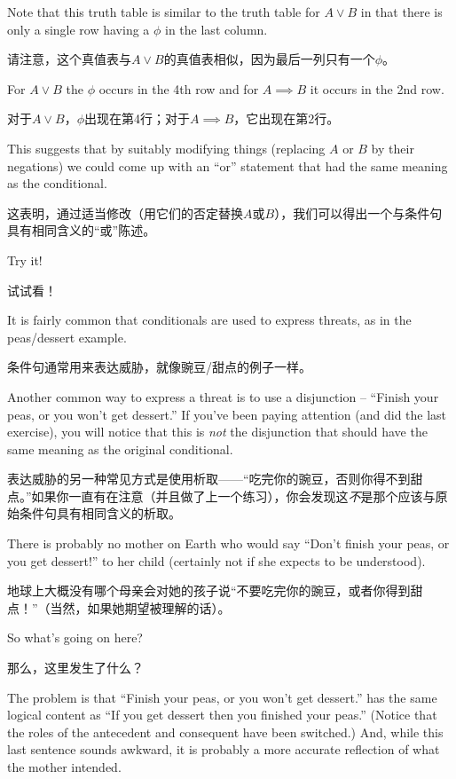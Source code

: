 \begin{exer} 
Note that this truth table is similar to the truth table for
$A \lor B$ in that there is only a single row having a $\phi$ in
the last column.

请注意，这个真值表与$A \lor B$的真值表相似，因为最后一列只有一个$\phi$。

For $A \lor B$ the $\phi$ occurs in the 4th row
and for $A \implies B$ it occurs in the 2nd row.

对于$A \lor B$，$\phi$出现在第4行；对于$A \implies B$，它出现在第2行。

This suggests
that by suitably modifying things (replacing $A$ or $B$ by their
negations) we could come up with an ``or'' statement that had the 
same meaning as the conditional.

这表明，通过适当修改（用它们的否定替换$A$或$B$），我们可以得出一个与条件句具有相同含义的“或”陈述。

Try it!

试试看！
\end{exer}

It is fairly common that conditionals are used to express threats,
as in the peas/dessert example.

条件句通常用来表达威胁，就像豌豆/甜点的例子一样。

Another common way to express a 
threat is to use a disjunction -- ``Finish your peas, or you won't
get dessert.''  If you've been paying attention (and did the last
exercise), you will notice that this is {\em  not} the disjunction
that should have the same meaning as the original conditional.

表达威胁的另一种常见方式是使用析取——“吃完你的豌豆，否则你得不到甜点。”如果你一直有在注意（并且做了上一个练习），你会发现这{\em 不}是那个应该与原始条件句具有相同含义的析取。

There is probably no mother on Earth who would say
``Don't finish your peas, or you get dessert!'' to her child
(certainly not if she expects to be understood).

地球上大概没有哪个母亲会对她的孩子说“不要吃完你的豌豆，或者你得到甜点！”（当然，如果她期望被理解的话）。

So what's going on
here?

那么，这里发生了什么？

The problem is that ``Finish your peas, or you won't
get dessert.'' has the same logical content as
``If you get dessert then you finished your peas.''
(Notice that the roles of the antecedent and consequent have been
switched.)  And, while this last sentence sounds awkward, it is
probably a more accurate reflection of what the mother intended.

